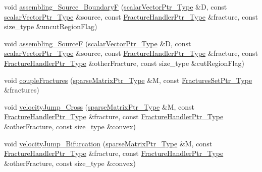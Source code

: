 \begin{DoxyCompactItemize}
\item 
void \hyperlink{namespacegetfem_ac08fe08fb325eede94ffe4968b7980de}{assembling\-\_\-\-Source\-\_\-\-Boundary\-F} (\hyperlink{Core_8h_ab09b6fa3c23db1b8c60456f8690c44a7}{scalar\-Vector\-Ptr\-\_\-\-Type} \&D, const \hyperlink{Core_8h_ab09b6fa3c23db1b8c60456f8690c44a7}{scalar\-Vector\-Ptr\-\_\-\-Type} \&source, const \hyperlink{FractureHandler_8h_af23fb7a30aaff864bd42587af4f1e78a}{Fracture\-Handler\-Ptr\-\_\-\-Type} \&fracture, const size\-\_\-type \&uncut\-Region\-Flag)
\item 
void \hyperlink{namespacegetfem_a5efeefe94dfb5427c3ecf63d0b342c57}{assembling\-\_\-\-Source\-F} (\hyperlink{Core_8h_ab09b6fa3c23db1b8c60456f8690c44a7}{scalar\-Vector\-Ptr\-\_\-\-Type} \&D, const \hyperlink{Core_8h_ab09b6fa3c23db1b8c60456f8690c44a7}{scalar\-Vector\-Ptr\-\_\-\-Type} \&source, const \hyperlink{FractureHandler_8h_af23fb7a30aaff864bd42587af4f1e78a}{Fracture\-Handler\-Ptr\-\_\-\-Type} \&fracture, const \hyperlink{FractureHandler_8h_af23fb7a30aaff864bd42587af4f1e78a}{Fracture\-Handler\-Ptr\-\_\-\-Type} \&other\-Fracture, const size\-\_\-type \&cut\-Region\-Flag)
\item 
void \hyperlink{namespacegetfem_a9a0b9f7498668cda8b547b10ac914a34}{couple\-Fractures} (\hyperlink{Core_8h_a87137a9501b38c724ac80bc955164bb7}{sparse\-Matrix\-Ptr\-\_\-\-Type} \&M, const \hyperlink{FracturesSet_8h_ac29a2a91d3af77fb459980a7db47f420}{Fractures\-Set\-Ptr\-\_\-\-Type} \&fractures)
\item 
void \hyperlink{namespacegetfem_acc74b86734c3814042e614d015f23876}{velocity\-Jump\-\_\-\-Cross} (\hyperlink{Core_8h_a87137a9501b38c724ac80bc955164bb7}{sparse\-Matrix\-Ptr\-\_\-\-Type} \&M, const \hyperlink{FractureHandler_8h_af23fb7a30aaff864bd42587af4f1e78a}{Fracture\-Handler\-Ptr\-\_\-\-Type} \&fracture, const \hyperlink{FractureHandler_8h_af23fb7a30aaff864bd42587af4f1e78a}{Fracture\-Handler\-Ptr\-\_\-\-Type} \&other\-Fracture, const size\-\_\-type \&convex)
\item 
void \hyperlink{namespacegetfem_a41dedc9759949101293821b324cf5ac6}{velocity\-Jump\-\_\-\-Bifurcation} (\hyperlink{Core_8h_a87137a9501b38c724ac80bc955164bb7}{sparse\-Matrix\-Ptr\-\_\-\-Type} \&M, const \hyperlink{FractureHandler_8h_af23fb7a30aaff864bd42587af4f1e78a}{Fracture\-Handler\-Ptr\-\_\-\-Type} \&fracture, const \hyperlink{FractureHandler_8h_af23fb7a30aaff864bd42587af4f1e78a}{Fracture\-Handler\-Ptr\-\_\-\-Type} \&other\-Fracture, const size\-\_\-type \&convex)
\end{DoxyCompactItemize}


